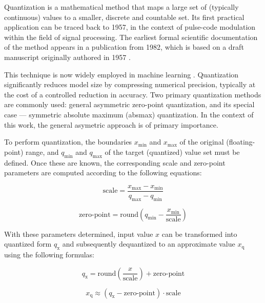 {Quantization is a mathematical method that maps a large set of (typically continuous) values to a smaller, discrete and countable set.
Its first practical application can be traced back to 1957, in the context of pulse-code modulation within the field of signal processing.
The earliest formal scientific documentation of the method appears in a publication from 1982,
which is based on a draft manuscript originally authored in 1957 \cite{firstQuantization}.

This technique is now widely employed in machine learning \cite{MLQuantization1, MLQuantization2, quantnnwhite}.
Quantization significantly reduces model size \cite{quantcompression} by compressing numerical precision, typically at the cost of a controlled reduction in accuracy.
Two primary quantization methods are commonly used: general asymmetric zero-point quantization, and its special case ---
symmetric absolute maximum (absmax) quantization.
In the context of this work, the general asymetric approach is of primary importance.

To perform quantization, the boundaries \( x_{\text{min}} \) and \( x_{\text{max}} \) of the original (floating-point) range,
and \( q_{\text{min}} \) and \( q_{\text{max}} \) of the target (quantized) value set must be defined.
Once these are known, the corresponding scale and zero-point parameters are computed according to the following equations:

\clearpage
\begin{equation}
\text{scale} = \frac{x_{\text{max}} - x_{\text{min}}}{q_{\text{max}} - q_{\text{min}}}
\label{eq:scale}
\end{equation}

\begin{equation}
\text{zero-point} = \text{round}\left( q_{\text{min}} - \frac{x_{\text{min}}}{\text{scale}} \right)
\label{eq:zeropoint}
\end{equation}

With these parameters determined,
input value \( x \) can be transformed into quantized form \( q_{\text{x}} \) and subsequently dequantized to an approximate value \( x_{\text{q}} \) using the following formulas:

\begin{equation}
q_{\text{x}} = \text{round}\left(\frac{x}{\text{scale}} \right) + \text{zero-point}
\label{eq:quantize}
\end{equation}

\begin{equation}
x_{\text{q}} \approx \left( q_{\text{x}} - \text{zero-point} \right) \cdot \text{scale}
\label{eq:dequantize}
\end{equation}

}
